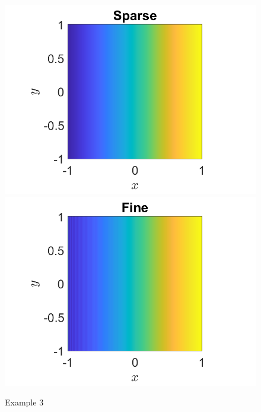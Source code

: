 \documentclass[11pt, a4paper]{article}
\theoremstyle{definition}
\begin{document}
\begin{figure}[h]
	\centering
	\includegraphics[scale=0.3]{Ex3a.png}
	\includegraphics[scale=0.3]{Ex3b.png}
	\caption{Example 3} 
	\label{F3}
\end{figure} 	
\end{document}
